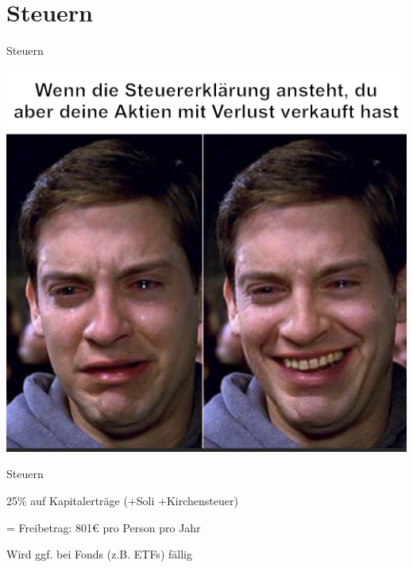\documentclass{beamer}
\begin{document}
	\section{Steuern}
	
		\begin{frame}
		\end{frame}
	
		\begin{frame}{Steuern}
			\begin{center}
				\vspace{-0.5cm}
				\includegraphics[height=0.85\textheight]{images/taxes-peter-parker}
			\end{center}
		\end{frame}
	
		\begin{frame}{Steuern}
			\begin{description}[labelwidth=0cm, align=right]
				\item[Kapitalertragssteuer] 25\% auf Kapitalerträge (+Soli +Kirchensteuer)
				\item[Sparerpauschbetrag] = Freibetrag: 801€ pro Person pro Jahr
				\item[Vorabpauschale] Wird ggf. bei Fonds (z.B. ETFs) fällig
			\end{description}
		\end{frame}
	
\end{document}
